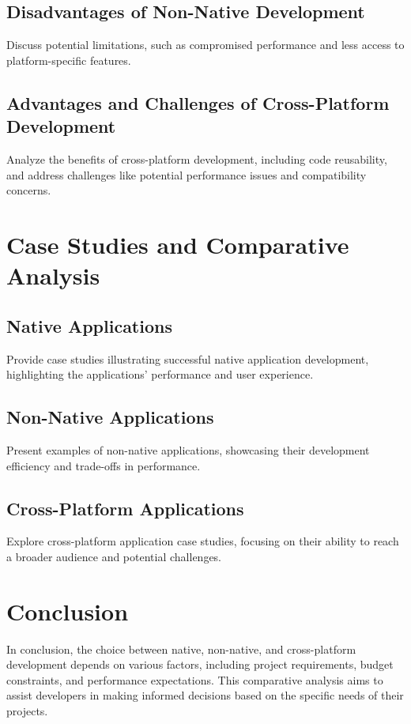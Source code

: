 \documentclass{article}
\begin{document}
	\subsection{Disadvantages of Non-Native Development}
	Discuss potential limitations, such as compromised performance and less access to platform-specific features.
	
	\subsection{Advantages and Challenges of Cross-Platform Development}
	Analyze the benefits of cross-platform development, including code reusability, and address challenges like potential performance issues and compatibility concerns.
	
	\section{Case Studies and Comparative Analysis}
	\subsection{Native Applications}
	Provide case studies illustrating successful native application development, highlighting the applications' performance and user experience.
	
	\subsection{Non-Native Applications}
	Present examples of non-native applications, showcasing their development efficiency and trade-offs in performance.
	
	\subsection{Cross-Platform Applications}
	Explore cross-platform application case studies, focusing on their ability to reach a broader audience and potential challenges.
	
	\section{Conclusion}
	In conclusion, the choice between native, non-native, and cross-platform development depends on various factors, including project requirements, budget constraints, and performance expectations. This comparative analysis aims to assist developers in making informed decisions based on the specific needs of their projects.
	
\end{document}
